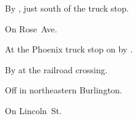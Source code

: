 
\begin{LocationList}

By , just south of the truck stop.

On  Rose~Ave.

At the Phoenix truck stop on  by  .

By  at the railroad crossing.

Off  in northeastern Burlington.

On  Lincoln~St.

\end{LocationList}
